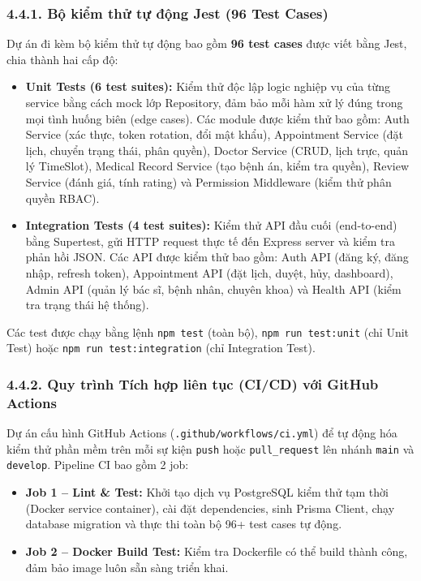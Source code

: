 \documentclass[12pt,a4paper]{report}
\begin{document}
\subsubsection*{4.4.1. Bộ kiểm thử tự động Jest (96 Test Cases)}
\hspace{1em} Dự án đi kèm bộ kiểm thử tự động bao gồm \textbf{96 test cases} được viết bằng Jest, chia thành hai cấp độ:
\begin{itemize}
    \item \textbf{Unit Tests (6 test suites):} Kiểm thử độc lập logic nghiệp vụ của từng service bằng cách mock lớp Repository, đảm bảo mỗi hàm xử lý đúng trong mọi tình huống biên (edge cases). Các module được kiểm thử bao gồm: Auth Service (xác thực, token rotation, đổi mật khẩu), Appointment Service (đặt lịch, chuyển trạng thái, phân quyền), Doctor Service (CRUD, lịch trực, quản lý TimeSlot), Medical Record Service (tạo bệnh án, kiểm tra quyền), Review Service (đánh giá, tính rating) và Permission Middleware (kiểm thử phân quyền RBAC).
    
    \item \textbf{Integration Tests (4 test suites):} Kiểm thử API đầu cuối (end-to-end) bằng Supertest, gửi HTTP request thực tế đến Express server và kiểm tra phản hồi JSON. Các API được kiểm thử bao gồm: Auth API (đăng ký, đăng nhập, refresh token), Appointment API (đặt lịch, duyệt, hủy, dashboard), Admin API (quản lý bác sĩ, bệnh nhân, chuyên khoa) và Health API (kiểm tra trạng thái hệ thống).
\end{itemize}
Các test được chạy bằng lệnh \texttt{npm test} (toàn bộ), \texttt{npm run test:unit} (chỉ Unit Test) hoặc \texttt{npm run test:integration} (chỉ Integration Test).

\subsubsection*{4.4.2. Quy trình Tích hợp liên tục (CI/CD) với GitHub Actions}
\hspace{1em} Dự án cấu hình GitHub Actions (\texttt{.github/workflows/ci.yml}) để tự động hóa kiểm thử phần mềm trên mỗi sự kiện \texttt{push} hoặc \texttt{pull\_request} lên nhánh \texttt{main} và \texttt{develop}. Pipeline CI bao gồm 2 job:
\begin{itemize}
    \item \textbf{Job 1 -- Lint \& Test:} Khởi tạo dịch vụ PostgreSQL kiểm thử tạm thời (Docker service container), cài đặt dependencies, sinh Prisma Client, chạy database migration và thực thi toàn bộ 96+ test cases tự động.
    \item \textbf{Job 2 -- Docker Build Test:} Kiểm tra Dockerfile có thể build thành công, đảm bảo image luôn sẵn sàng triển khai.
\end{itemize}
\end{document}
